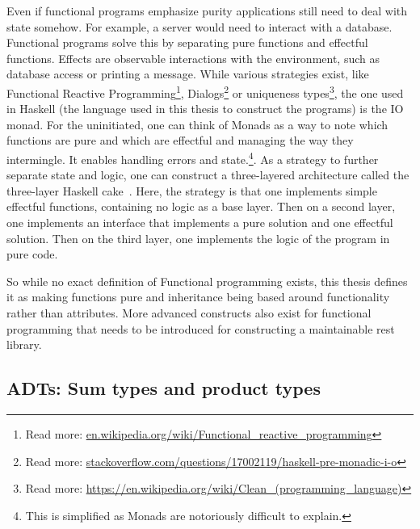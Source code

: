 \begin{description}
Even if functional programs emphasize purity applications still need to deal
        with state somehow. For example, a server would need to interact with a
        database. Functional programs solve this by separating pure functions
        and effectful functions. Effects are observable interactions with the
        environment, such as database access or printing a message.  While
        various strategies exist, like Functional Reactive
        Programming\footnote{Read more:
        \url{en.wikipedia.org/wiki/Functional_reactive_programming}},
        Dialogs\footnote{Read more:
        \url{stackoverflow.com/questions/17002119/haskell-pre-monadic-i-o}} or
        uniqueness types\footnote{Read more:
        \url{https://en.wikipedia.org/wiki/Clean_(programming_language)}}, the
        one used in Haskell (the language used in this thesis to construct the
        programs) is the IO monad. For the uninitiated, one can think of Monads
        as a way to note which functions are pure and which are effectful and
        managing the way they intermingle. It enables handling errors
        and state.\footnote{This is simplified as Monads are notoriously
        difficult to explain.}.  As a strategy to further separate state and logic, one can construct a
three-layered architecture called the three-layer Haskell
cake~\cite{parsonsmatt}. Here,
        the strategy is that one implements simple effectful functions,
        containing no logic as a base layer. Then on a second layer, one
        implements an interface that implements a pure solution and one
        effectful solution. Then on the third layer, one implements the logic of
        the program in pure code.  
\end{description}

So while no exact definition of Functional programming exists, this thesis
defines it as making functions pure and inheritance being based around
functionality rather than attributes. More advanced constructs also exist for
functional programming that needs to be introduced for constructing a
maintainable rest library. 

\subsection{ADTs: Sum types and product types}\label{types}

